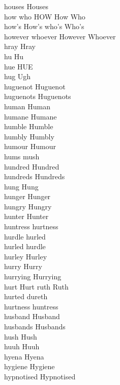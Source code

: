 houses Houses\\
how who HOW How Who\\
how's How's who's Who's\\
however whoever However Whoever\\
hray Hray\\
hu Hu\\
hue HUE\\
hug Ugh\\
huguenot Huguenot\\
huguenots Huguenots\\
human Human\\
humane Humane\\
humble Humble\\
humbly Humbly\\
humour Humour\\
hums mush\\
hundred Hundred\\
hundreds Hundreds\\
hung Hung\\
hunger Hunger\\
hungry Hungry\\
hunter Hunter\\
huntress hurtness\\
hurdle hurled\\
hurled hurdle\\
hurley Hurley\\
hurry Hurry\\
hurrying Hurrying\\
hurt Hurt ruth Ruth\\
hurted dureth\\
hurtness huntress\\
husband Husband\\
husbands Husbands\\
hush Hush\\
huuh Huuh\\
hyena Hyena\\
hygiene Hygiene\\
hypnotised Hypnotised\\

